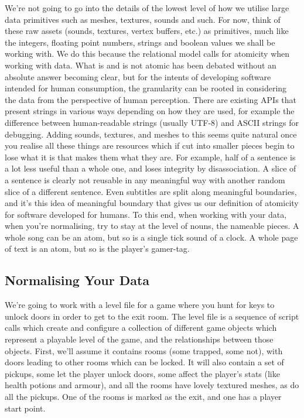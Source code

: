 \documentclass[a4paper,12pt]{book}
\begin{document}
We're not going to go into the details of the lowest level of how we utilise large data primitives such as meshes, textures, sounds and such.
For now, think of these raw assets (sounds, textures, vertex buffers, etc.) as primitives, much like the integers, floating point numbers, strings and boolean values we shall be working with.
We do this because the relational model calls for atomicity when working with data.
What is and is not atomic has been debated without an absolute answer becoming clear, but for the intents of developing software intended for human consumption, the granularity can be rooted in considering the data from the perspective of human perception.
There are existing APIs that present strings in various ways depending on how they are used, for example the difference between human-readable strings (usually UTF-8) and ASCII strings for debugging.
Adding sounds, textures, and meshes to this seems quite natural once you realise all these things are resources which if cut into smaller pieces begin to lose what it is that makes them what they are.
For example, half of a sentence is a lot less useful than a whole one, and loses integrity by disassociation.
A slice of a sentence is clearly not reusable in any meaningful way with another random slice of a different sentence.
Even subtitles are split along meaningful boundaries, and it's this idea of meaningful boundary that gives us our definition of atomicity for software developed for humans.
To this end, when working with your data, when you're normalising, try to stay at the level of nouns, the nameable pieces.
A whole song can be an atom, but so is a single tick sound of a clock.
A whole page of text is an atom, but so is the player's gamer-tag.

\subsection{Normalising Your Data}

We're going to work with a level file for a game where you hunt for keys to unlock doors in order to get to the exit room.
The level file is a sequence of script calls which create and configure a collection of different game objects which represent a playable level of the game, and the relationships between those objects.
First, we'll assume it contains rooms (some trapped, some not), with doors leading to other rooms which can be locked.
It will also contain a set of pickups, some let the player unlock doors, some affect the player's stats (like health potions and armour), and all the rooms have lovely textured meshes, as do all the pickups.
One of the rooms is marked as the exit, and one has a player start point.
\end{document}
